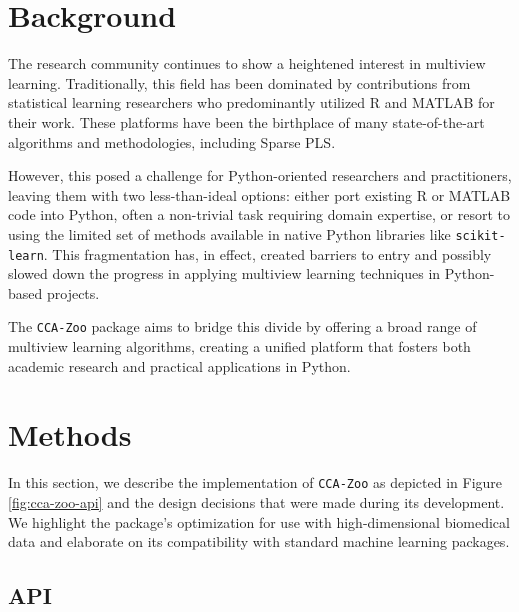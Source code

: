 \section{Background}

The research community continues to show a heightened interest in multiview learning.
Traditionally, this field has been dominated by contributions from statistical learning researchers who predominantly utilized R and MATLAB for their work.
These platforms have been the birthplace of many state-of-the-art algorithms and methodologies, including Sparse PLS.

However, this posed a challenge for Python-oriented researchers and practitioners, leaving them with two less-than-ideal options: either port existing R or MATLAB code into Python, often a non-trivial task requiring domain expertise, or resort to using the limited set of methods available in native Python libraries like \texttt{scikit-learn}.
This fragmentation has, in effect, created barriers to entry and possibly slowed down the progress in applying multiview learning techniques in Python-based projects.

The \texttt{CCA-Zoo} package aims to bridge this divide by offering a broad range of multiview learning algorithms, creating a unified platform that fosters both academic research and practical applications in Python.

\section{Methods}

In this section, we describe the implementation of \texttt{CCA-Zoo} as depicted in Figure \ref{fig:cca-zoo-api} and the design decisions that were made during its development.
We highlight the package's optimization for use with high-dimensional biomedical data and elaborate on its compatibility with standard machine learning packages.

\subsection{API}

